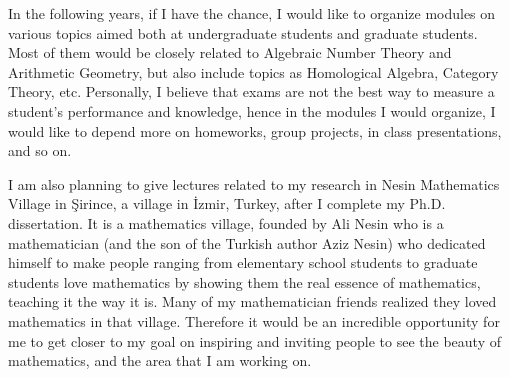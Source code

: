 \documentclass{article}
\begin{document}
\vspace{5mm}

\par In the following years, if I have the chance, I would like to organize modules on various topics aimed both at undergraduate students and graduate students. Most of them would be closely related to Algebraic Number Theory and Arithmetic Geometry, but also include topics as Homological Algebra, Category Theory, etc. Personally, I believe that exams are not the best way to measure a student's performance and knowledge, hence in the modules I would organize, I would like to depend more on homeworks, group projects, in class presentations, and so on. 

\par I am also planning to give lectures related to my research in Nesin Mathematics Village in Şirince, a village in İzmir, Turkey, after I complete my Ph.D. dissertation. It is a mathematics village, founded by Ali Nesin who is a mathematician (and the son of the Turkish author Aziz Nesin) who dedicated himself to make people ranging from elementary school students to graduate students love mathematics by showing them the real essence of mathematics, teaching it the way it is. Many of my mathematician friends realized they loved mathematics in that village. Therefore it would be an incredible opportunity for me to get closer to my goal on inspiring and inviting people to see the beauty of mathematics, and the area that I am working on.
\end{document}
